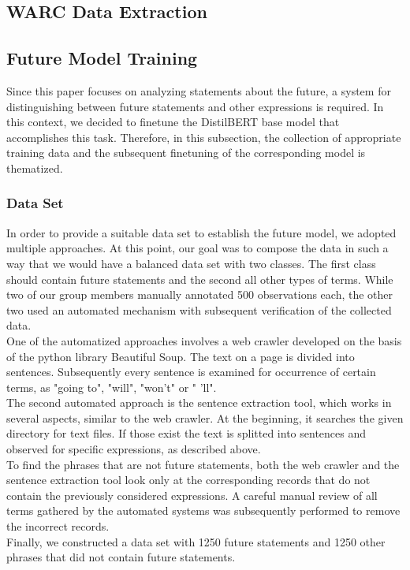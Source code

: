 \documentclass[11pt]{article}
\begin{document}
\subsection{WARC Data Extraction}

\subsection{Future Model Training}
Since this paper focuses on analyzing statements about the future, a system for distinguishing between future statements and other expressions is required. In this context, we decided to finetune the DistilBERT base model that accomplishes this task. Therefore, in this subsection, the collection of appropriate training data and the subsequent finetuning of the corresponding model is thematized. 
\subsubsection{Data Set}
In order to provide a suitable data set to establish the future model, we adopted multiple approaches. At this point, our goal was to compose the data in such a way that we would have a balanced data set with two classes. The first class should contain future statements and the second all other types of terms.
While two of our group members manually annotated 500 observations each, the other two used an automated mechanism with subsequent verification of the collected data. \\
One of the automatized approaches involves a web crawler developed on the basis of the python library Beautiful Soup. The text on a page is divided into sentences. Subsequently every sentence is examined for occurrence of certain terms, as "going to", "will", "won't" or " 'll".\\
The second automated approach is the sentence extraction tool, which works in several aspects, similar to the web crawler. 
At the beginning, it searches the given directory for text files. If those exist the text is splitted into sentences and observed for specific expressions, as described above.\\
To find the phrases that are not future statements, both the web crawler and the sentence extraction tool look only at the corresponding records that do not contain the previously considered expressions. A careful manual review of all terms gathered by the automated systems was subsequently performed to remove the incorrect records. \\
Finally, we constructed a data set with 1250 future statements and 1250 other phrases that did not contain future statements.
\end{document}
